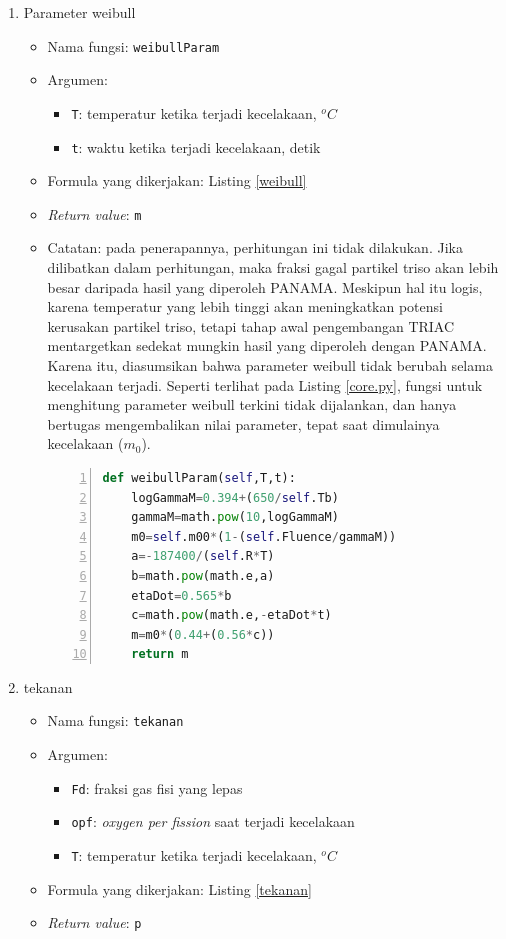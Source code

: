 \documentclass[a4paper,11pt]{report}
\begin{document}
\begin{enumerate}
  \item Parameter weibull
  \begin{itemize}
    \item Nama fungsi: \texttt{weibullParam}
    \item Argumen:
    \begin{itemize}
      \item \texttt{T}: temperatur ketika terjadi kecelakaan, $^{o}C$
      \item \texttt{t}: waktu ketika terjadi kecelakaan, detik 
    \end{itemize}
    \item Formula yang dikerjakan: Listing \ref{weibull}
    \item \textit{Return value}: \texttt{m}
    \item Catatan: pada penerapannya, perhitungan ini tidak dilakukan. Jika dilibatkan dalam perhitungan, maka fraksi gagal partikel triso akan lebih besar daripada hasil yang diperoleh PANAMA. Meskipun hal itu logis, karena temperatur yang lebih tinggi akan meningkatkan potensi kerusakan partikel triso, tetapi tahap awal pengembangan TRIAC mentargetkan sedekat mungkin hasil yang diperoleh dengan PANAMA. Karena itu, diasumsikan bahwa parameter weibull tidak berubah selama kecelakaan terjadi. Seperti terlihat pada Listing \ref{core.py}, fungsi untuk menghitung parameter weibull terkini tidak dijalankan, dan hanya bertugas mengembalikan nilai parameter, tepat saat dimulainya kecelakaan ($m_0$).
    
\scriptsize
\begin{lstlisting}[language=python, numbers=left, numberstyle=\tiny, caption=Fungsi weibullParam, showstringspaces=false, label=weibull]
def weibullParam(self,T,t):
	logGammaM=0.394+(650/self.Tb)
	gammaM=math.pow(10,logGammaM)
	m0=self.m00*(1-(self.Fluence/gammaM))
	a=-187400/(self.R*T)
	b=math.pow(math.e,a)
	etaDot=0.565*b
	c=math.pow(math.e,-etaDot*t)
	m=m0*(0.44+(0.56*c))
	return m
\end{lstlisting}
\normalsize
  \end{itemize}
  
  \item tekanan
  \begin{itemize}
    \item Nama fungsi: \texttt{tekanan}
    \item Argumen:
    \begin{itemize}
      \item \texttt{Fd}: fraksi gas fisi yang lepas
      \item \texttt{opf}: \textit{oxygen per fission} saat terjadi kecelakaan
      \item \texttt{T}: temperatur ketika terjadi kecelakaan, $^{o}C$
    \end{itemize}
    \item Formula yang dikerjakan: Listing \ref{tekanan}
    \item \textit{Return value}: \texttt{p}
    

\end{itemize}
\end{enumerate}
\end{document}
